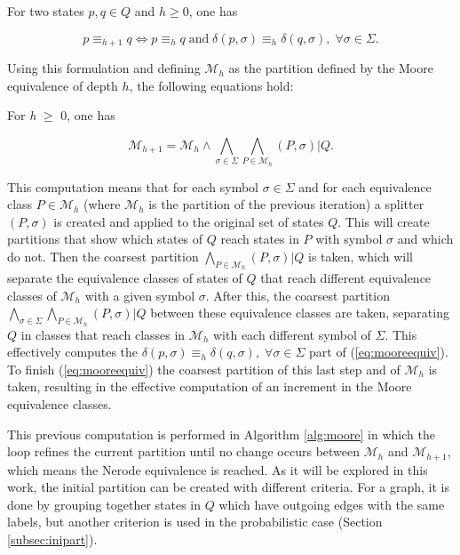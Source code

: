 {\begin{proposition}\label{prop:makemooreeasy}
For two states $p, q \in Q$ and $h \geq 0$, one has

\end{proposition}

\begin{equation}\label{eq:mooreequiv}
p \equiv_{h+1} q \Longleftrightarrow p \equiv_{h} q\; \text{and} \;\delta(p,\sigma) \equiv_h \delta(q,\sigma), \; \forall \sigma \in \Sigma.
\end{equation}

\noindent Using this formulation and defining $\mathcal{M}_h$ as the partition defined by the Moore equivalence of depth $h$, the following equations hold:

\begin{proposition}\label{prop:moorecomp}
For \textit{h} $\geq$ 0, one has

\end{proposition}

\begin{equation}\label{eq:mooreequiv}
\mathcal{M}_{h+1} = \mathcal{M}_h \wedge \bigwedge_{\sigma\in\Sigma} \bigwedge_{P\in\mathcal{M}_h}(P,\sigma)|Q.
\end{equation}

\noindent This computation means that for each symbol $\sigma\in\Sigma$ and for each equivalence class $P\in\mathcal{M}_h$ (where $\mathcal{M}_h$ is the partition of the previous iteration) a splitter $(P,\sigma)$ is created and applied to the original set of states $Q$. This will create partitions that show which states of $Q$ reach states in $P$ with symbol $\sigma$ and which do not. Then the coarsest partition $\bigwedge_{P\in\mathcal{M}_h}(P,\sigma)|Q$ is taken, which will separate the equivalence classes of states of $Q$ that reach different equivalence classes of $\mathcal{M}_h$ with a given symbol $\sigma$. After this, the coarsest partition $\bigwedge_{\sigma\in\Sigma} \bigwedge_{P\in\mathcal{M}_h}(P,\sigma)|Q$ between these equivalence classes are taken, separating $Q$ in classes that reach classes in $\mathcal{M}_h$ with each different symbol of $\Sigma$. This effectively computes the $\delta(p,\sigma) \equiv_h \delta(q,\sigma), \; \forall \sigma \in \Sigma$ part of (\ref{eq:mooreequiv}). To finish (\ref{eq:mooreequiv}) the coarsest partition of this last step and of $\mathcal{M}_h$ is taken, resulting in the effective computation of an increment in the Moore equivalence classes.

 This previous computation is performed in Algorithm \ref{alg:moore} in which the loop refines the current partition until no change occurs between $\mathcal{M}_h$ and $\mathcal{M}_{h+1}$, which means the Nerode equivalence is reached. As it will be explored in this work, the initial partition can be created with different criteria. For a graph, it is done by grouping together states in $Q$ which have outgoing edges with the same labels, but another criterion is used in the probabilistic case (Section \ref{subsec:inipart}).

}
